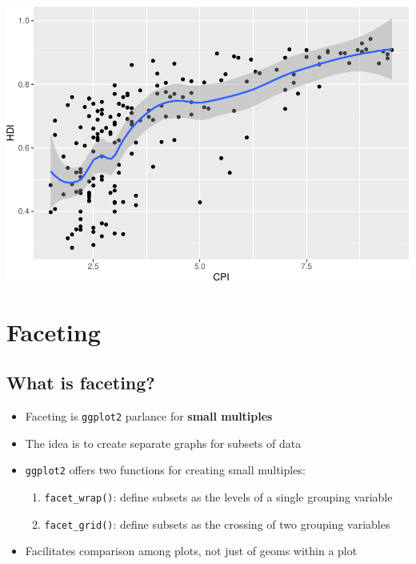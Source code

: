 \documentclass[
]{book}
\providecommand{\tightlist}{%
  \setlength{\itemsep}{0pt}\setlength{\parskip}{0pt}}
\begin{document}
\begin{alert}
\includegraphics{R/Rgraphics/figures/unnamed-chunk-204-1.pdf}

\end{alert}

\hypertarget{faceting}{%
\section{Faceting}\label{faceting}}

\hypertarget{what-is-faceting}{%
\subsection{What is faceting?}\label{what-is-faceting}}

\begin{itemize}
\tightlist
\item
  Faceting is \texttt{ggplot2} parlance for \textbf{small multiples}
\item
  The idea is to create separate graphs for subsets of data
\item
  \texttt{ggplot2} offers two functions for creating small multiples:

  \begin{enumerate}
  \def\labelenumi{\arabic{enumi}.}
  \tightlist
  \item
    \texttt{facet\_wrap()}: define subsets as the levels of a single grouping variable
  \item
    \texttt{facet\_grid()}: define subsets as the crossing of two grouping variables
  \end{enumerate}
\item
  Facilitates comparison among plots, not just of geoms within a plot
\end{itemize}
\end{document}
